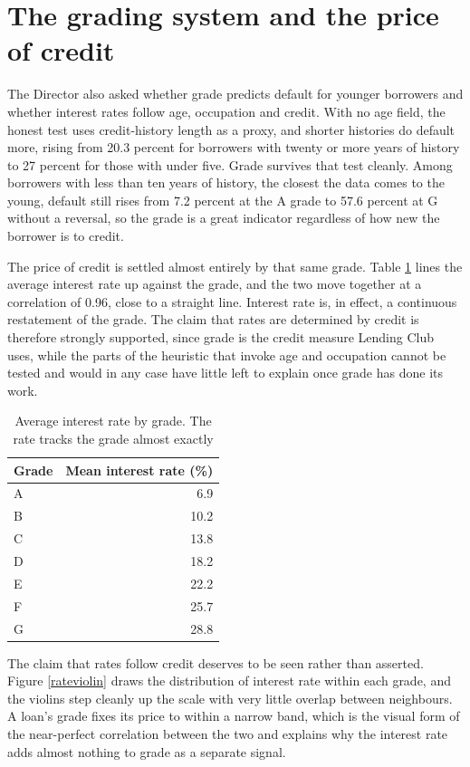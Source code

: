\documentclass[11pt,preprint]{elsarticle}
\numberwithin{equation}{section}
\numberwithin{figure}{section}
\numberwithin{table}{section}
\begin{document}
\section*{The grading system and the price of
credit}\label{the-grading-system-and-the-price-of-credit}

The Director also asked whether grade predicts default for younger
borrowers and whether interest rates follow age, occupation and credit.
With no age field, the honest test uses credit-history length as a
proxy, and shorter histories do default more, rising from 20.3 percent
for borrowers with twenty or more years of history to 27 percent for
those with under five. Grade survives that test cleanly. Among borrowers
with less than ten years of history, the closest the data comes to the
young, default still rises from 7.2 percent at the A grade to 57.6
percent at G without a reversal, so the grade is a great indicator
regardless of how new the borrower is to credit.

The price of credit is settled almost entirely by that same grade. Table
\ref{irtab} lines the average interest rate up against the grade, and
the two move together at a correlation of 0.96, close to a straight
line. Interest rate is, in effect, a continuous restatement of the
grade. The claim that rates are determined by credit is therefore
strongly supported, since grade is the credit measure Lending Club uses,
while the parts of the heuristic that invoke age and occupation cannot
be tested and would in any case have little left to explain once grade
has done its work.

\begin{longtable}[t]{lr}
\caption{\label{tab:irtab}\label{irtab}Average interest rate by grade. The rate tracks the grade almost exactly}\\
\toprule
Grade & Mean interest rate (\%)\\
\midrule
A & 6.9\\
B & 10.2\\
C & 13.8\\
D & 18.2\\
E & 22.2\\
\addlinespace
F & 25.7\\
G & 28.8\\
\bottomrule
\end{longtable}

The claim that rates follow credit deserves to be seen rather than
asserted. Figure \ref{rateviolin} draws the distribution of interest
rate within each grade, and the violins step cleanly up the scale with
very little overlap between neighbours. A loan's grade fixes its price
to within a narrow band, which is the visual form of the near-perfect
correlation between the two and explains why the interest rate adds
almost nothing to grade as a separate signal.
\end{document}
